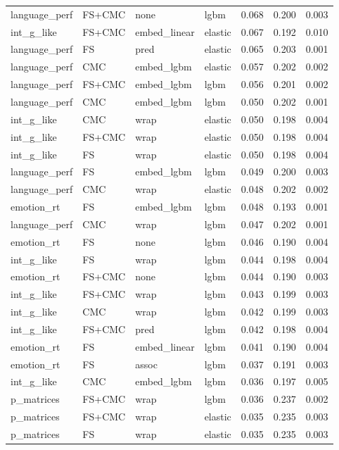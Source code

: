 \documentclass{article}
\begin{document}
\begin{table}
\begin{tabular}{llllrrr}
	language\_perf & FS+CMC & none & lgbm & 0.068 & 0.200 & 0.003 \\
	int\_g\_like & FS+CMC & embed\_linear & elastic & 0.067 & 0.192 & 0.010 \\
	language\_perf & FS & pred & elastic & 0.065 & 0.203 & 0.001 \\
	language\_perf & CMC & embed\_lgbm & elastic & 0.057 & 0.202 & 0.002 \\
	language\_perf & FS+CMC & embed\_lgbm & lgbm & 0.056 & 0.201 & 0.002 \\
	language\_perf & CMC & embed\_lgbm & lgbm & 0.050 & 0.202 & 0.001 \\
	int\_g\_like & CMC & wrap & elastic & 0.050 & 0.198 & 0.004 \\
	int\_g\_like & FS+CMC & wrap & elastic & 0.050 & 0.198 & 0.004 \\
	int\_g\_like & FS & wrap & elastic & 0.050 & 0.198 & 0.004 \\
	language\_perf & FS & embed\_lgbm & lgbm & 0.049 & 0.200 & 0.003 \\
	language\_perf & CMC & wrap & elastic & 0.048 & 0.202 & 0.002 \\
	emotion\_rt & FS & embed\_lgbm & lgbm & 0.048 & 0.193 & 0.001 \\
	language\_perf & CMC & wrap & lgbm & 0.047 & 0.202 & 0.001 \\
	emotion\_rt & FS & none & lgbm & 0.046 & 0.190 & 0.004 \\
	int\_g\_like & FS & wrap & lgbm & 0.044 & 0.198 & 0.004 \\
	emotion\_rt & FS+CMC & none & lgbm & 0.044 & 0.190 & 0.003 \\
	int\_g\_like & FS+CMC & wrap & lgbm & 0.043 & 0.199 & 0.003 \\
	int\_g\_like & CMC & wrap & lgbm & 0.042 & 0.199 & 0.003 \\
	int\_g\_like & FS+CMC & pred & lgbm & 0.042 & 0.198 & 0.004 \\
	emotion\_rt & FS & embed\_linear & lgbm & 0.041 & 0.190 & 0.004 \\
	emotion\_rt & FS & assoc & lgbm & 0.037 & 0.191 & 0.003 \\
	int\_g\_like & CMC & embed\_lgbm & lgbm & 0.036 & 0.197 & 0.005 \\
	p\_matrices & FS+CMC & wrap & lgbm & 0.036 & 0.237 & 0.002 \\
	p\_matrices & FS+CMC & wrap & elastic & 0.035 & 0.235 & 0.003 \\
	p\_matrices & FS & wrap & elastic & 0.035 & 0.235 & 0.003 \\

\end{tabular}
\end{table}
\end{document}
